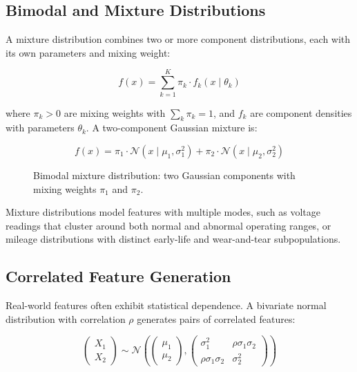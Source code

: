 \documentclass[10pt,a4paper]{article}
\begin{document}
\subsection{Bimodal and Mixture Distributions}
\label{sec:mixture-distributions}

A mixture distribution combines two or more component distributions, each with its own parameters and mixing weight:

\begin{equation}
f(x) = \sum_{k=1}^{K} \pi_k \cdot f_k(x \mid \theta_k)
\label{eq:mixture}
\end{equation}

where $\pi_k > 0$ are mixing weights with $\sum_k \pi_k = 1$, and $f_k$ are component densities with parameters $\theta_k$. A two-component Gaussian mixture is:

\begin{equation}
f(x) = \pi_1 \cdot \mathcal{N}(x \mid \mu_1, \sigma_1^2) + \pi_2 \cdot \mathcal{N}(x \mid \mu_2, \sigma_2^2)
\label{eq:bimodal}
\end{equation}

\begin{figure}[H]
    \centering
    \caption{Bimodal mixture distribution: two Gaussian components with mixing weights $\pi_1$ and $\pi_2$.}
    \label{fig:mixture-distribution}
\end{figure}

Mixture distributions model features with multiple modes, such as voltage readings that cluster around both normal and abnormal operating ranges, or mileage distributions with distinct early-life and wear-and-tear subpopulations.

\subsection{Correlated Feature Generation}
\label{sec:correlated-features}

Real-world features often exhibit statistical dependence. A bivariate normal distribution with correlation $\rho$ generates pairs of correlated features:

\begin{equation}
\begin{pmatrix} X_1 \\ X_2 \end{pmatrix} \sim \mathcal{N}\left(\begin{pmatrix} \mu_1 \\ \mu_2 \end{pmatrix}, \begin{pmatrix} \sigma_1^2 & \rho\sigma_1\sigma_2 \\ \rho\sigma_1\sigma_2 & \sigma_2^2 \end{pmatrix}\right)
\label{eq:bivariate-normal}
\end{equation}
\end{document}
